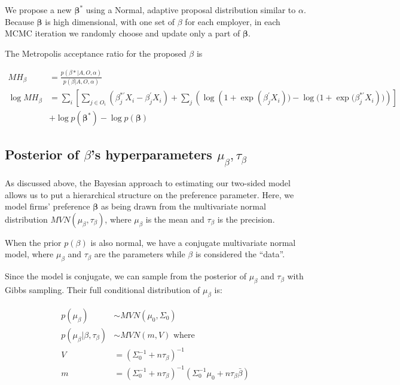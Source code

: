We propose a new $\bm{\beta}^*$ using a Normal, adaptive proposal distribution
similar to $\alpha$. Because $\bm{\beta}$ is high dimensional, with one set of
$\beta$ for each employer, in each MCMC iteration we randomly choose and update
only a part of $\bm{\beta}$.

The Metropolis acceptance ratio for the proposed $\beta$ is

\begin{align}
  MH_\beta &= \frac{p(\beta* | A, O, \alpha)}{p(\beta | A, O, \alpha)} \\
  \log MH_\beta &= \sum_i \left[ \sum_{j \in O_i} \left(\beta_j^{*\prime}X_i - \beta_j^{\prime}X_i \right) + \sum_{j} \left( \log(1 + {\exp({\beta_j^{\prime}X_i})) - \log(1 +  \exp(\beta_j^{*\prime}X_i})) \right) \right] \nonumber \\
                & + \log p(\bm{\beta}^*) - \log p(\bm{\beta})
\end{align}


\subsection{Posterior of $\beta$'s hyperparameters $\mu_{\beta}, \tau_{\beta}$}

As discussed above, the Bayesian approach to estimating our two-sided model
allows us to put a hierarchical structure on the preference parameter. Here, we
model firms' preference $\bm{\beta}$ as being drawn from the multivariate normal
distribution $MVN(\mu_{\beta}, \tau_{\beta})$, where $\mu_{\beta}$ is the mean
and $\tau_{\beta}$ is the precision.

When the prior $p(\beta)$ is also normal, we have a conjugate multivariate
normal model, where $\mu_{\beta}$ and $\tau_{\beta}$ are the parameters while
$\beta$ is considered the ``data''.

Since the model is conjugate, we can sample from the posterior of $\mu_{\beta}$
and $\tau_{\beta}$ with Gibbs sampling. Their full conditional distribution of
$\mu_{\beta}$ is:

\begin{align}
  p(\mu_{\beta}) &\sim MVN(\mu_0, \Sigma_0) \\
  p(\mu_{\beta} | \beta, \tau_{\beta}) &\sim MVN(m, V) \text{ where } \\
  V &= (\Sigma_0^{-1} + n \tau_{\beta})^{-1} \\
  m &= (\Sigma_0^{-1} + n \tau_{\beta})^{-1} (\Sigma_0^{-1}\mu_0 + n \tau_{\beta} \bar \beta)
\end{align}

